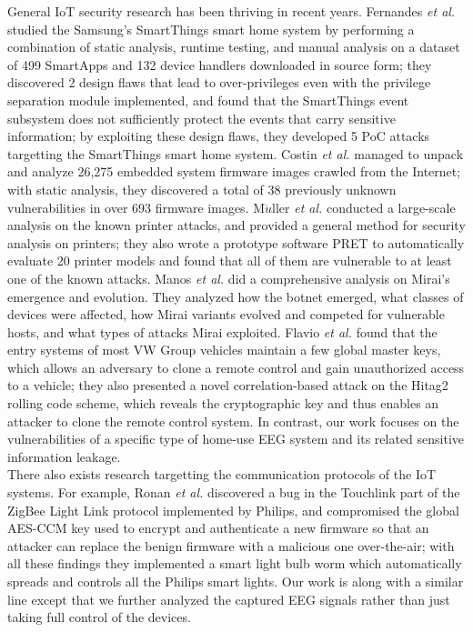 General IoT security research has been thriving in recent years. Fernandes \emph{et al.} \cite{fernandes2016security} studied the Samsung's SmartThings smart home system by performing a combination of static analysis, runtime testing, and manual analysis on a dataset of 499 SmartApps and 132 device handlers downloaded in source form; they discovered 2 design flaws that lead to over-privileges even with the privilege separation module implemented, and found that the SmartThings event subsystem does not sufficiently protect the events that carry sensitive information; by exploiting these design flaws, they developed 5 PoC attacks targetting the SmartThings smart home system.  Costin \emph{et al.} \cite{costin2014large} managed to unpack and analyze 26,275 embedded system firmware images crawled from the Internet; with static analysis, they discovered a total of 38 previously unknown vulnerabilities in over 693 firmware images. M$\ddot{u}$ller \emph{et al.} \cite{muller2017sok} conducted a large-scale analysis on the known printer attacks, and provided a general method for security analysis on printers; they also wrote a prototype software PRET to automatically evaluate 20 printer models and found that all of them are vulnerable to at least one of the known attacks. Manos \emph{et al.} \cite{antonakakis2017understanding} did a comprehensive analysis on Mirai's emergence and evolution. They analyzed how the botnet emerged, what classes of devices were affected, how Mirai variants evolved and competed for vulnerable hosts, and what types of attacks Mirai exploited.  Flavio \emph{et al.}  \cite{garcia2016lock} found that the entry systems of most VW Group vehicles maintain a few global master keys, which allows an adversary to clone a remote control and gain unauthorized access to a vehicle; they also presented a novel correlation-based attack on the Hitag2 rolling code scheme, which reveals the cryptographic key and thus enables an attacker to clone the remote control system. In contrast, our work focuses on the vulnerabilities of a specific type of home-use EEG system and its related sensitive information leakage. \\
%
\indent There also exists research targetting the communication protocols of the IoT systems. For example, Ronan \emph{et al.} \cite{ronen2017iot} discovered a bug in the Touchlink part of the ZigBee Light Link protocol implemented by Philips, and compromised the global AES-CCM key used to encrypt and authenticate a new firmware so that an attacker can replace the benign firmware with a malicious one over-the-air; with all these findings they implemented a smart light bulb worm which automatically spreads and controls all the Philips smart lights. Our work is along with a similar line except that we further analyzed the captured EEG signals rather than just taking full control of the devices.


